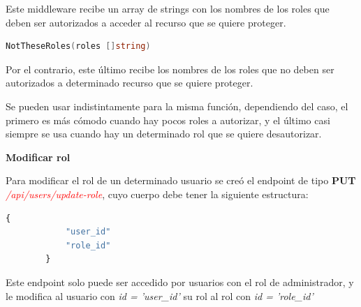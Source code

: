 Este middleware recibe un array de strings con los nombres de los roles que deben ser autorizados a acceder al recurso que se quiere proteger.

\begin{lstlisting}[language=go]
	NotTheseRoles(roles []string)
\end{lstlisting}

Por el contrario, este último recibe los nombres de los roles que no deben ser autorizados a determinado recurso que se quiere proteger.
\newline

Se pueden usar indistintamente para la misma función, dependiendo del caso, el primero es más cómodo cuando hay pocos roles a autorizar, y el último casi siempre se usa cuando hay un determinado rol que se quiere desautorizar. 
\newline

\textbf{Modificar rol}

Para modificar el rol de un determinado usuario se creó el endpoint de tipo \textbf{PUT} \textit{\textcolor{red}{/api/users/update-role}}, cuyo cuerpo debe tener la siguiente estructura:

\begin{lstlisting}[language=javascript]
		{
			"user_id"
			"role_id"
		}
\end{lstlisting}

Este endpoint solo puede ser accedido por usuarios con el rol de administrador, y le modifica al usuario con \textit{id = 'user\_id'} su rol al rol con \textit{id = 'role\_id'}